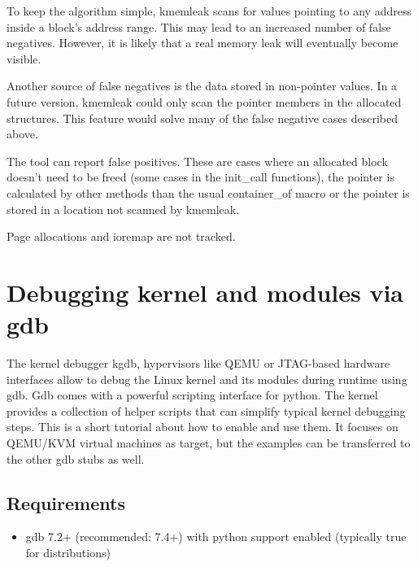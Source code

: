 \documentclass[a4paper,8pt,english]{sphinxmanual}
\begin{document}
To keep the algorithm simple, kmemleak scans for values pointing to any
address inside a block's address range. This may lead to an increased
number of false negatives. However, it is likely that a real memory leak
will eventually become visible.

Another source of false negatives is the data stored in non-pointer
values. In a future version, kmemleak could only scan the pointer
members in the allocated structures. This feature would solve many of
the false negative cases described above.

The tool can report false positives. These are cases where an allocated
block doesn't need to be freed (some cases in the init\_call functions),
the pointer is calculated by other methods than the usual container\_of
macro or the pointer is stored in a location not scanned by kmemleak.

Page allocations and ioremap are not tracked.


\chapter{Debugging kernel and modules via gdb}
\label{dev-tools/gdb-kernel-debugging:debugging-kernel-and-modules-via-gdb}\label{dev-tools/gdb-kernel-debugging::doc}
The kernel debugger kgdb, hypervisors like QEMU or JTAG-based hardware
interfaces allow to debug the Linux kernel and its modules during runtime
using gdb. Gdb comes with a powerful scripting interface for python. The
kernel provides a collection of helper scripts that can simplify typical
kernel debugging steps. This is a short tutorial about how to enable and use
them. It focuses on QEMU/KVM virtual machines as target, but the examples can
be transferred to the other gdb stubs as well.


\section{Requirements}
\label{dev-tools/gdb-kernel-debugging:requirements}\begin{itemize}
\item {} 
gdb 7.2+ (recommended: 7.4+) with python support enabled (typically true
for distributions)

\end{itemize}
\end{document}
